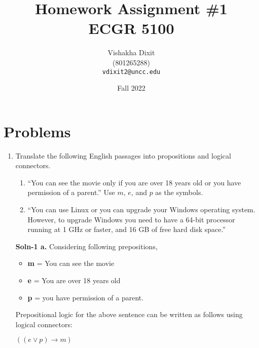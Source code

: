 \documentclass{article}
\begin{document}
\title{Homework Assignment \#1 \\ ECGR 5100}
\author{
  Vishakha Dixit \\
  (801265288) \\
  \texttt{vdixit2@uncc.edu}
}
\date{Fall 2022}
\maketitle

\section*{Problems}
\begin{enumerate}
\item   Translate the following English passages into propositions
        and logical connectors.
        \begin{enumerate}
        \item   {\sffamily ``You can see the movie only if you are
                over 18 years old or you have permission of a parent.''}
                Use $m$, $e$, and $p$ as the symbols.
        \item   {\sffamily ``You can use Linux or you can upgrade your
                Windows operating system.  However, to upgrade Windows
                you need to have a 64-bit processor running at 1 GHz
                or faster, and 16 GB of free hard disk space.''}
        \end{enumerate}

        \textbf{Soln-1 a.} Considering following prepositions, 
        \begin{itemize}
                \item   \textbf{m} = You can see the movie 
                \item   \textbf{e} = You are over 18 years old
                \item   \textbf{p} = you have permission of a parent. 
        \end{itemize}
        Prepositional logic for the above sentence can be written as follows using logical connectors: 
        \begin{center}
       $((e \vee p) \rightarrow m)$
        \end{center}


\end{enumerate}
\end{document}
